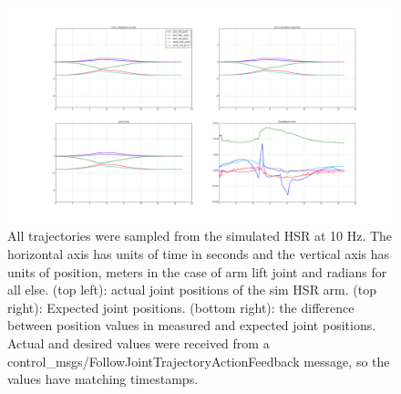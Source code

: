\documentclass[12pt]{article}
\begin{document}
        \begin{figure}
            \includegraphics[width=\linewidth]{2020.04.02/positions.png}
            \centering
            \caption{All trajectories were sampled from the simulated HSR at 10 Hz. The horizontal axis has units of time in seconds and the vertical axis has units of position, meters in the case of arm lift joint and radians for all else. (top left): actual joint positions of the sim HSR arm. (top right): Expected joint positions. (bottom right): the difference between position values in measured and expected joint positions. Actual and desired values were received from a control\_msgs/FollowJointTrajectoryActionFeedback message, so the values have matching timestamps.}
            \label{fig:posAccuracy}
        \end{figure}
\end{document}

